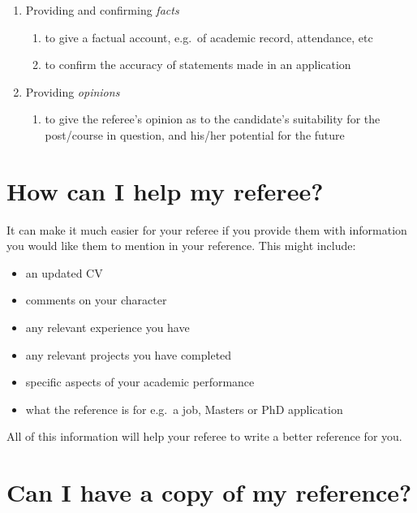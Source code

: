 \documentclass[
  12pt,
]{book}
\providecommand{\tightlist}{%
  \setlength{\itemsep}{0pt}\setlength{\parskip}{0pt}}
\begin{document}
\begin{enumerate}
\def\labelenumi{\arabic{enumi}.}
\tightlist
\item
  Providing and confirming \emph{facts}

  \begin{enumerate}
  \def\labelenumii{\roman{enumii}.}
  \tightlist
  \item
    to give a factual account, e.g.~of academic record, attendance, etc
  \item
    to confirm the accuracy of statements made in an application
  \end{enumerate}
\item
  Providing \emph{opinions}

  \begin{enumerate}
  \def\labelenumii{\roman{enumii}.}
  \tightlist
  \item
    to give the referee's opinion as to the candidate's suitability for the post/course in
    question, and his/her potential for the future
  \end{enumerate}
\end{enumerate}

\hypertarget{how-can-i-help-my-referee}{%
\section{How can I help my referee?}\label{how-can-i-help-my-referee}}

It can make it much easier for your referee if you provide them with information you would like them to mention in your reference. This might include:

\begin{itemize}
\tightlist
\item
  an updated CV\\
\item
  comments on your character
\item
  any relevant experience you have
\item
  any relevant projects you have completed
\item
  specific aspects of your academic performance
\item
  what the reference is for e.g.~a job, Masters or PhD application
\end{itemize}

All of this information will help your referee to write a better reference for you.

\hypertarget{can-i-have-a-copy-of-my-reference}{%
\section{Can I have a copy of my reference?}\label{can-i-have-a-copy-of-my-reference}}
\end{document}
